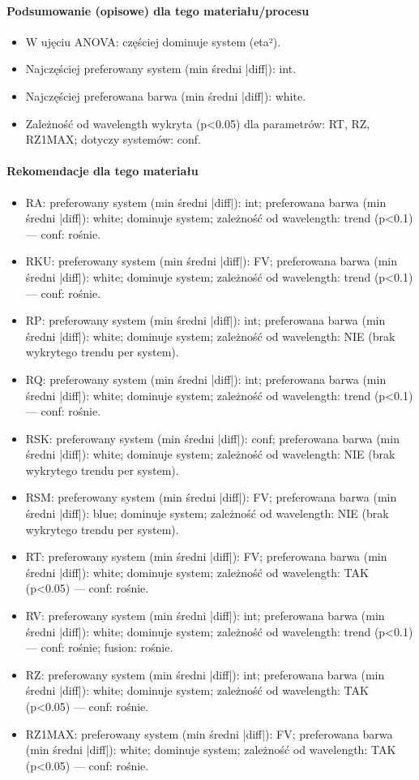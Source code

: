 \documentclass[
  10pt,
]{article}
\begin{document}
\paragraph{Podsumowanie (opisowe) dla tego materiału/procesu}
\begin{itemize}
\item W ujęciu ANOVA: częściej dominuje system (eta²).
\item Najczęściej preferowany system (min średni |diff|): int.
\item Najczęściej preferowana barwa (min średni |diff|): white.
\item Zależność od wavelength wykryta (p<0.05) dla parametrów: RT, RZ, RZ1MAX; dotyczy systemów: conf.
\end{itemize}
\paragraph{Rekomendacje dla tego materiału}
\begin{itemize}
\item RA: preferowany system (min średni |diff|): int; preferowana barwa (min średni |diff|): white; dominuje system; zależność od wavelength: trend (p<0.1) — conf: rośnie.
\item RKU: preferowany system (min średni |diff|): FV; preferowana barwa (min średni |diff|): white; dominuje system; zależność od wavelength: trend (p<0.1) — conf: rośnie.
\item RP: preferowany system (min średni |diff|): int; preferowana barwa (min średni |diff|): white; dominuje system; zależność od wavelength: NIE (brak wykrytego trendu per system).
\item RQ: preferowany system (min średni |diff|): int; preferowana barwa (min średni |diff|): white; dominuje system; zależność od wavelength: trend (p<0.1) — conf: rośnie.
\item RSK: preferowany system (min średni |diff|): conf; preferowana barwa (min średni |diff|): white; dominuje system; zależność od wavelength: NIE (brak wykrytego trendu per system).
\item RSM: preferowany system (min średni |diff|): FV; preferowana barwa (min średni |diff|): blue; dominuje system; zależność od wavelength: NIE (brak wykrytego trendu per system).
\item RT: preferowany system (min średni |diff|): FV; preferowana barwa (min średni |diff|): white; dominuje system; zależność od wavelength: TAK (p<0.05) — conf: rośnie.
\item RV: preferowany system (min średni |diff|): int; preferowana barwa (min średni |diff|): white; dominuje system; zależność od wavelength: trend (p<0.1) — conf: rośnie; fusion: rośnie.
\item RZ: preferowany system (min średni |diff|): int; preferowana barwa (min średni |diff|): white; dominuje system; zależność od wavelength: TAK (p<0.05) — conf: rośnie.
\item RZ1MAX: preferowany system (min średni |diff|): FV; preferowana barwa (min średni |diff|): white; dominuje system; zależność od wavelength: TAK (p<0.05) — conf: rośnie.
\end{itemize}
\end{document}
